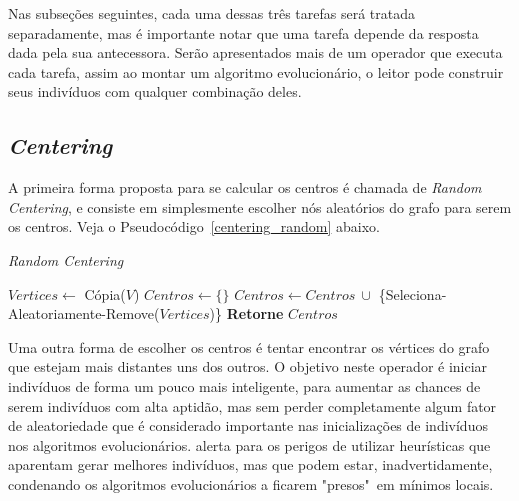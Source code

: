 Nas subseções seguintes, cada uma dessas três tarefas será tratada 
separadamente, mas é importante notar que uma tarefa depende da resposta dada 
pela sua antecessora. Serão apresentados mais de um operador que executa cada 
tarefa, assim ao montar um algoritmo evolucionário, o leitor pode construir 
seus indivíduos com qualquer combinação deles.

\subsection{\textit{Centering}}

A primeira forma proposta para se calcular os centros é chamada de 
\textit{Random Centering}, e consiste em simplesmente escolher nós aleatórios do 
grafo para serem os centros. Veja o Pseudocódigo~\ref{centering_random} abaixo.

\begin{algorithm}                  %
	\caption{\textit{Random Centering}}          %
	\label{centering_random}                           %
	\begin{algorithmic}                    %
		\newline
		\State $Vertices \gets $ Cópia($V$)
		\State $Centros \gets \{\}$
			\State $Centros \gets Centros\ \cup$ \{Seleciona-Aleatoriamente-Remove($Vertices$)\}
		\EndFor
		\State \textbf{Retorne} $Centros$
		\EndProcedure
	\end{algorithmic}
\end{algorithm}

Uma outra forma de escolher os centros é tentar encontrar os vértices do grafo 
que estejam mais distantes uns dos outros. O objetivo neste operador é iniciar 
indivíduos de forma um pouco mais inteligente, para aumentar as chances de 
serem indivíduos com alta aptidão, mas sem perder completamente algum fator de 
aleatoriedade que é considerado importante nas inicializações de indivíduos nos 
algoritmos evolucionários. \citep{Luke2013Metaheuristics} alerta para os perigos 
de utilizar heurísticas que aparentam gerar melhores indivíduos, mas que podem 
estar, inadvertidamente, condenando os algoritmos evolucionários a ficarem 
"presos"\ em mínimos locais.

